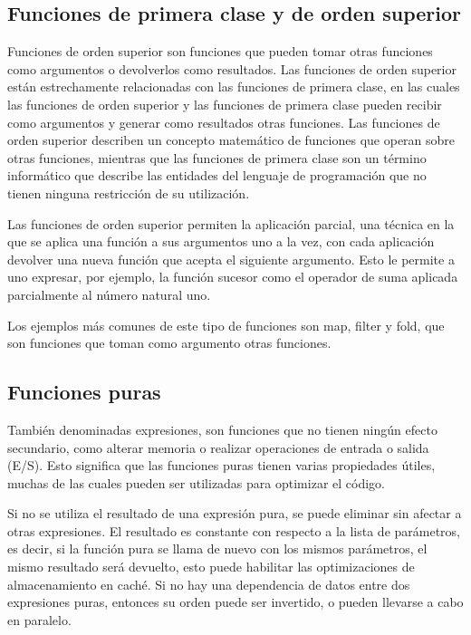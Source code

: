 
\subsection{Funciones de primera clase y de orden superior}

Funciones de orden superior son funciones que pueden tomar otras funciones como argumentos o devolverlos como resultados. Las funciones de orden superior están estrechamente relacionadas con las funciones de primera clase, en las cuales las funciones de orden superior y las funciones de primera clase pueden recibir como argumentos y generar como resultados otras funciones. Las funciones de orden superior describen un concepto matemático de funciones que operan sobre otras funciones, mientras que las funciones de primera clase son un término informático que describe las entidades del lenguaje de programación que no tienen ninguna restricción de su utilización.

Las funciones de orden superior permiten la aplicación parcial, una técnica en la que se aplica una función a sus argumentos uno a la vez, con cada aplicación devolver una nueva función que acepta el siguiente argumento. Esto le permite a uno expresar, por ejemplo, la función sucesor como el operador de suma aplicada parcialmente al número natural uno.

Los ejemplos más comunes de este tipo de funciones son map, filter y fold, que son funciones que toman como argumento otras funciones.

\subsection{Funciones puras}

También denominadas expresiones, son funciones que no tienen ningún efecto secundario, como alterar memoria o realizar operaciones de entrada o salida (E/S). Esto significa que las funciones puras tienen varias propiedades útiles, muchas de las cuales pueden ser utilizadas para optimizar el código.

Si no se utiliza el resultado de una expresión pura, se puede eliminar sin afectar a otras expresiones. El resultado es constante con respecto a la lista de parámetros, es decir, si la función pura se llama de nuevo con los mismos parámetros, el mismo resultado será devuelto, esto puede habilitar las optimizaciones de almacenamiento en caché. Si no hay una dependencia de datos entre dos expresiones puras, entonces su orden puede ser invertido, o pueden llevarse a cabo en paralelo.

